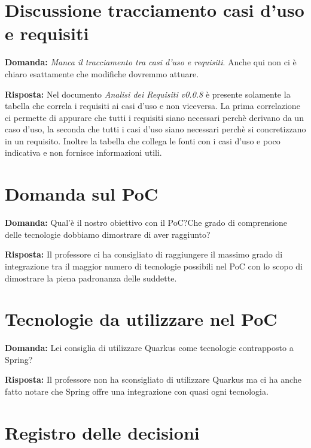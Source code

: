 \documentclass{article}
\begin{document}
\section{Discussione tracciamento casi d'uso e requisiti}%
\label{sec:discussione_tracciamento_casi_requisiti}
\textbf{Domanda:} \textit{Manca il tracciamento tra casi d’uso e requisiti}. Anche qui non ci è chiaro esattamente che modifiche dovremmo attuare.

\textbf{Risposta:} Nel documento \textit{Analisi dei Requisiti v0.0.8} è presente solamente la tabella che correla i requisiti ai casi d'uso e non viceversa.
La prima correlazione ci permette di appurare che tutti i requisiti siano necessari perchè derivano da un caso d'uso, la seconda che tutti i casi d'uso siano necessari perchè si concretizzano in un requisito.
Inoltre la tabella che collega le fonti con i casi d'uso e poco indicativa e non fornisce informazioni utili.

\section{Domanda sul PoC}%
\label{sec:domanda_poc}
\textbf{Domanda:} Qual'è il nostro obiettivo con il PoC?\@ Che grado di comprensione delle tecnologie dobbiamo dimostrare di aver raggiunto?

\textbf{Risposta:} Il professore ci ha consigliato di raggiungere il massimo grado di integrazione tra il maggior numero di tecnologie possibili nel PoC con lo scopo di dimostrare la piena padronanza delle suddette.
\section{Tecnologie da utilizzare nel PoC}%
\label{sec:tecnologie_poc}
\textbf{Domanda:} Lei consiglia di utilizzare Quarkus come tecnologie contrapposto a Spring?

\textbf{Risposta:} Il professore non ha sconsigliato di utilizzare Quarkus ma ci ha anche fatto notare che Spring offre una integrazione con quasi ogni tecnologia.
\newpage
\section{Registro delle decisioni}%
\label{sec:registro_delle_decisioni}
\end{document}
